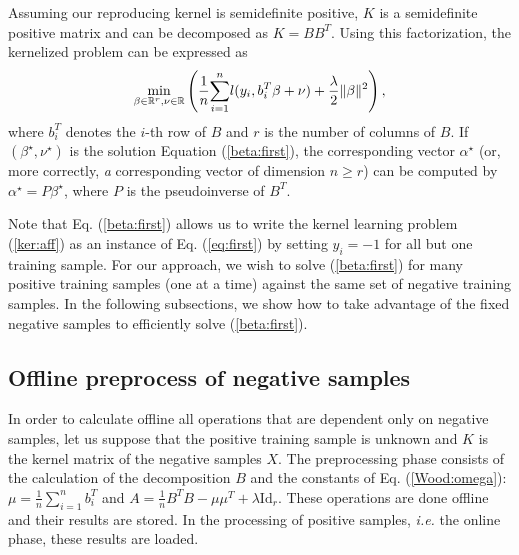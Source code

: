 


Assuming our reproducing kernel is semidefinite positive, 
$K$ is a semidefinite positive matrix and can be decomposed as $K=BB^T$.
Using this factorization, the kernelized problem can be expressed as 
\begin{equation}
\min_{\beta\in\mathbb R^r,\nu\in\mathbb R} \left( \dfrac{1}{n}\displaystyle{\sum_{i=1}^n} l(y_i, b_i^T\beta+\nu)+\dfrac{\lambda}{2}\|\beta\|^2\right), \label{beta:first}
\end{equation}
where $b_i^T$ denotes the $i$-th row of $B$ and $r$ is the number of columns of $B$. 
If $(\beta^\star, \nu^\star)$ is the solution Equation (\ref{beta:first}), the corresponding vector $\alpha^\star$ (or, more correctly, \textit{a} corresponding vector of dimension $n\geq r$) 
can be computed by $\alpha^\star=P\beta^\star$, where $P$ is the pseudoinverse of $B^T$.

Note that Eq. (\ref{beta:first}) allows us to write the kernel learning problem (\ref{ker:aff}) as an instance of Eq. (\ref{eq:first}) by setting $y_i=-1$ for all but one training sample. For our approach, we wish to solve (\ref{beta:first}) for many positive training samples (one at a time) against the same set of negative training samples. In the following subsections, we show how to take advantage of the fixed negative samples to efficiently solve (\ref{beta:first}).

\subsection{Offline preprocess of negative samples}\label{offline}
In order to calculate offline all operations that are dependent only on negative samples, let us suppose that the positive training sample is unknown and $K$ is the kernel matrix of the negative samples $X$.
The preprocessing phase consists of the calculation of the decomposition $B$ and the constants of Eq. (\ref{Wood:omega}): $\mu = \frac{1}{n}\sum_{i=1}^n b_i^T$ and $A = \frac{1}{n}B^TB-\mu\mu^T +\lambda\mathrm{Id}_r.$
These operations are done offline and their results are stored. In the processing of positive samples, \emph{i.e.} the online phase, these results are loaded.

